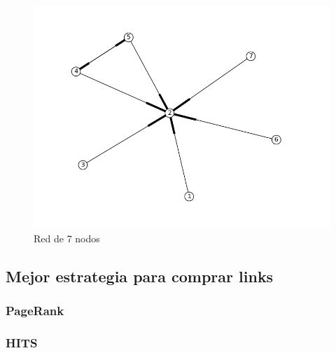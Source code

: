  \begin{figure}[!htb]
\begin{center}
    \includegraphics[scale=0.5]{imagenes/test4.png}
    \caption{Red de 7 nodos}
    \end{center}
\end{figure}

\subsection{Mejor estrategia para comprar links}
\subsubsection{PageRank}
\subsubsection{HITS}
